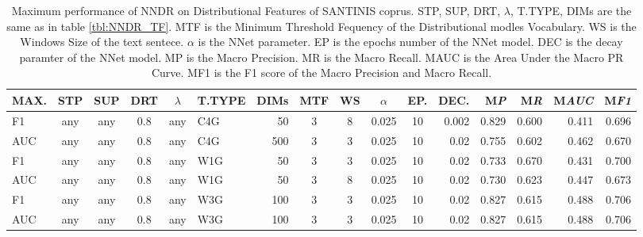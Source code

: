 \documentclass[runningheads]{llncs}
\begin{document}
\begin{table}
\center
\begin{tabular}{|l|cccc|lr|ccccr|rrrr|}
\hline
MAX. & STP & SUP & DRT & $\lambda$ & T.TYPE & DIMs & MTF & WS & $\alpha$ & EP. & DEC. & M\emph{P} & M\emph{R} & M\emph{AUC} & M\emph{F1} \\
\hline
F1 & any & any & 0.8 & any & C4G & 50 & 3 & 8 & 0.025 & 10 & 0.002 & 0.829 & 0.600 & 0.411 & 0.696 \\
AUC & any & any & 0.8 & any & C4G & 500 & 3 & 3 & 0.025 & 10 & 0.02 & 0.755 & 0.602 & 0.462 & 0.670 \\
F1 & any & any & 0.8 & any & W1G & 50 & 3 & 3 & 0.025 & 10 & 0.02 & 0.733 & 0.670 & 0.431 & 0.700 \\
AUC & any & any & 0.8 & any & W1G & 50 & 3 & 8 & 0.025 & 10 & 0.02 & 0.730 & 0.623 & 0.447 & 0.673 \\
F1 & any & any & 0.8 & any & W3G & 100 & 3 & 3 & 0.025 & 10 & 0.02 & 0.827 & 0.615 & 0.488 & 0.706 \\
AUC & any & any & 0.8 & any & W3G & 100 & 3 & 3 & 0.025 & 10 & 0.02 & 0.827 & 0.615 & 0.488 & 0.706 \\
\hline
\end{tabular}
\caption {Maximum performance of NNDR on Distributional Features of SANTINIS coprus. STP, SUP, DRT, $\lambda$, T.TYPE, DIMs are the same as in table \ref{tbl:NNDR_TF}. MTF is the Minimum Threshold Fequency of the Distributional modles Vocabulary. WS is the Windows Size of the text sentece. $\alpha$ is the NNet parameter. EP is the epochs number of the NNet model. DEC is the decay paramter of the NNet model. MP is the Macro Precision. MR is the Macro Recall. MAUC is the Area Under the Macro PR Curve. MF1 is the F1 score of the Macro Precision and Macro Recall.}
\label{tbl:NNDR_Gensim}
\vspace{-20mm}
\end{table}

\pagebreak


\end{document}
